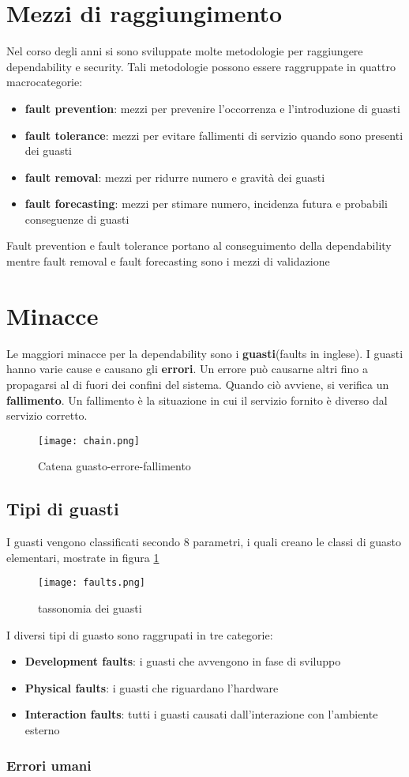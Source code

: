 \section{Mezzi di raggiungimento}
Nel corso degli anni si sono sviluppate molte metodologie per raggiungere dependability e security. Tali metodologie possono essere raggruppate in quattro macrocategorie:
\begin{itemize}
    \item \textbf{fault prevention}: mezzi per prevenire l'occorrenza e l'introduzione di guasti
    \item \textbf{fault tolerance}: mezzi per evitare fallimenti di servizio quando sono presenti dei guasti
    \item \textbf{fault removal}: mezzi per ridurre numero e gravità dei guasti
    \item \textbf{fault forecasting}: mezzi per stimare numero, incidenza futura e probabili conseguenze di guasti
\end{itemize}
Fault prevention e fault tolerance portano al conseguimento della dependability mentre fault removal e fault forecasting sono i mezzi di validazione
\section{Minacce}
Le maggiori minacce per la dependability sono i \textbf{guasti}(faults in inglese). I guasti hanno varie cause e causano gli \textbf{errori}. Un errore può causarne altri fino a propagarsi
al di fuori dei confini del sistema. Quando ciò avviene, si verifica un \textbf{fallimento}. Un fallimento è la situazione in cui il servizio fornito
è diverso dal servizio corretto.
\begin{figure}[h]
    \texttt{[image: chain.png]}
    \caption{Catena guasto-errore-fallimento}
\end{figure}
\subsection{Tipi di guasti}
I guasti vengono classificati secondo 8 parametri, i quali creano le classi di guasto elementari, mostrate in figura \ref{fig:tax}
\begin{figure}[h]
    \texttt{[image: faults.png]}
    \caption{tassonomia dei guasti\cite{tax}}
    \label{fig:tax}
\end{figure}
 I diversi tipi di guasto sono raggrupati in tre categorie:
 \begin{itemize}
     \item \textbf{Development faults}: i guasti che avvengono in fase di sviluppo
     \item \textbf{Physical faults}: i guasti che riguardano l'hardware
     \item \textbf{Interaction faults}: tutti i guasti causati dall'interazione con l'ambiente esterno
 \end{itemize}
 \newpage
 \subsubsection{Errori umani}

